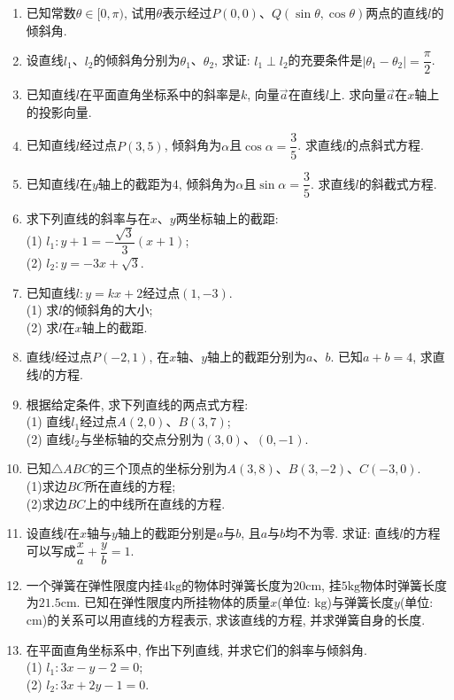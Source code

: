 \documentclass[10pt,a4paper]{article}
\begin{document}
\begin{enumerate}[1.]
\item 已知常数$\theta \in [0, \pi)$, 试用$\theta$表示经过$P(0, 0)$、$Q(\sin \theta , \cos \theta)$两点的直线$l$的倾斜角.
\item 设直线$l_1$、$l_2$的倾斜角分别为$\theta_1$、$\theta_2$, 求证: $l_1\perp l_2$的充要条件是$|\theta_1-\theta_2|=\dfrac \pi 2$.
\item 已知直线$l$在平面直角坐标系中的斜率是$k$, 向量$\overrightarrow a$在直线$l$上. 求向量$\overrightarrow a$在$x$轴上的投影向量.
\item 已知直线$l$经过点$P(3, 5)$, 倾斜角为$\alpha$且$\cos\alpha=\dfrac 35$. 求直线$l$的点斜式方程.
\item 已知直线$l$在$y$轴上的截距为$4$, 倾斜角为$\alpha$且$\sin\alpha=\dfrac 35$. 求直线$l$的斜截式方程.
\item 求下列直线的斜率与在$x$、$y$两坐标轴上的截距:\\
(1) $l_1: y+1=-\dfrac {\sqrt 3}3(x+1)$;\\
(2) $l_2: y=-3x+\sqrt 3$.
\item 已知直线$l: y=kx+2$经过点$(1, -3)$.\\
(1) 求$l$的倾斜角的大小;\\
(2) 求$l$在$x$轴上的截距.
\item 直线$l$经过点$P(-2, 1)$, 在$x$轴、$y$轴上的截距分别为$a$、$b$. 已知$a+b=4$, 求直线$l$的方程.
\item 根据给定条件, 求下列直线的两点式方程:\\
(1) 直线$l_1$经过点$A(2, 0)$、$B(3, 7)$;\\
(2) 直线$l_2$与坐标轴的交点分别为$(3, 0)$、$(0, -1)$.
\item 已知$\triangle ABC$的三个顶点的坐标分别为$A(3, 8)$、$B(3, -2)$、$C(-3, 0)$.\\
(1)求边$BC$所在直线的方程;\\
(2)求边$BC$上的中线所在直线的方程.
\item 设直线$l$在$x$轴与$y$轴上的截距分别是$a$与$b$, 且$a$与$b$均不为零. 求证: 直线$l$的方程可以写成$\dfrac xa+\dfrac yb=1$.
\item 一个弹簧在弹性限度内挂$4\text{kg}$的物体时弹簧长度为$20\text{cm}$, 挂$5\text{kg}$物体时弹簧长度为$21.5\text{cm}$. 已知在弹性限度内所挂物体的质量$x$(单位: $\text{kg}$)与弹簧长度$y$(单位: $\text{cm}$)的关系可以用直线的方程表示, 求该直线的方程, 并求弹簧自身的长度.
\item 在平面直角坐标系中, 作出下列直线, 并求它们的斜率与倾斜角.\\
(1) $l_1: 3x-y-2=0$;\\
(2) $l_2: 3x+2y-1=0$.

\end{enumerate}
\end{document}
